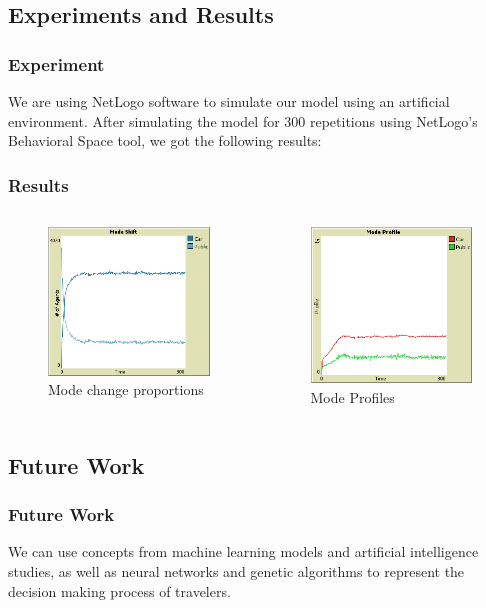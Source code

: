 \documentclass[aspectratio=169]{beamer}
\begin{document}
\subsection{Experiments and Results}
\begin{frame}
\frametitle{Experiment}
We are using NetLogo software to simulate our model using an artificial environment. After simulating the model for 300 repetitions using NetLogo's \alert{Behavioral Space} tool, we got the following results:
\end{frame}

\begin{frame}
\frametitle{Results}
\begin{columns}[c]
  \column{2in}  %
  \begin{figure}
  \includegraphics[width=5cm]{Simulation 1 mode shift}
  \caption{Mode change proportions}
  \end{figure}
 
  \column{2in}
   \begin{figure}

	\includegraphics[width=5cm]{Simulation 1 mode profile}

\caption{Mode Profiles}
\end{figure}

 \end{columns}
\end{frame}
\subsection{Future Work}
\begin{frame}
\frametitle{Future Work}
We can use concepts from machine learning models and artificial intelligence studies, as well as neural networks and genetic algorithms to represent the decision making process of travelers.
\end{frame}
\end{document}
